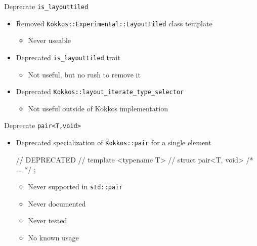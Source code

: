 
\begin{frame}[fragile]{Deprecate \texttt{is\_layouttiled}}
\begin {itemize}
\item Removed \texttt{Kokkos::Experimental::LayoutTiled} class template
  \begin{itemize}
  \item Never useable
  \end{itemize}
\item Deprecated \texttt{is\_layouttiled} trait
  \begin{itemize}
  \item Not useful, but no rush to remove it
  \end{itemize}
\item Deprecated \texttt{Kokkos::layout\_iterate\_type\_selector}
  \begin{itemize}
  \item Not useful outside of Kokkos implementation
  \end{itemize}
\end{itemize}
\end{frame}

\begin{frame}[fragile]{Deprecate \texttt{pair<T,void>}}
\begin {itemize}
\item Deprecated specialization of \texttt{Kokkos::pair} for a single element
\begin{code}
// DEPRECATED
// template <typename T>
// struct pair<T, void> { /* ... */ };
\end{code}
  \begin{itemize}
  \item Never supported in \texttt{std::pair}
  \item Never documented
  \item Never tested
  \item No known usage
  \end{itemize}
\end{itemize}
\end{frame}

